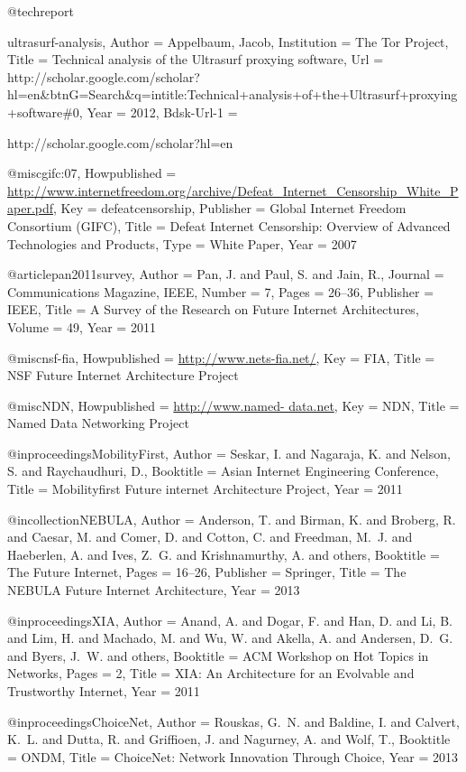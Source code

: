 {{{{{{{@techreport{ultrasurf-analysis,
	Author = {Appelbaum, Jacob},
	Institution = {The Tor Project},
	Title = {{Technical analysis of the Ultrasurf proxying software}},
	Url = {http://scholar.google.com/scholar?hl=en\&btnG=Search\&q=intitle:Technical+analysis+of+the+Ultrasurf+proxying+software\#0},
	Year = {2012},
	Bdsk-Url-1 = {http://scholar.google.com/scholar?hl=en%

@misc{gifc:07,
	Howpublished = {\url{http://www.internetfreedom.org/archive/Defeat\_Internet\_Censorship\_White\_Paper.pdf}},
	Key = {defeatcensorship},
	Publisher = {Global Internet Freedom Consortium (GIFC)},
	Title = {{Defeat Internet Censorship: Overview of Advanced Technologies and Products}},
	Type = {White Paper},
	Year = {2007}}

@article{pan2011survey,
	Author = {Pan, J. and Paul, S. and Jain, R.},
	Journal = {Communications Magazine, IEEE},
	Number = {7},
	Pages = {26--36},
	Publisher = {IEEE},
	Title = {{A Survey of the Research on Future Internet Architectures}},
	Volume = {49},
	Year = {2011}}

@misc{nsf-fia,
	Howpublished = {\url{http://www.nets-fia.net/}},
	Key = {FIA},
	Title = {{NSF Future Internet Architecture Project}}}

@misc{NDN,
	Howpublished = {\url{http://www.named- data.net}},
	Key = {NDN},
	Title = {{Named Data Networking Project}}}

@inproceedings{MobilityFirst,
	Author = {Seskar, I. and Nagaraja, K. and Nelson, S. and Raychaudhuri, D.},
	Booktitle = {Asian Internet Engineering Conference},
	Title = {{Mobilityfirst Future internet Architecture Project}},
	Year = {2011}}

@incollection{NEBULA,
	Author = {Anderson, T. and Birman, K. and Broberg, R. and Caesar, M. and Comer, D. and Cotton, C. and Freedman, M.~J. and Haeberlen, A. and Ives, Z.~G. and Krishnamurthy, A. and others},
	Booktitle = {The Future Internet},
	Pages = {16--26},
	Publisher = {Springer},
	Title = {{The NEBULA Future Internet Architecture}},
	Year = {2013}}

@inproceedings{XIA,
	Author = {Anand, A. and Dogar, F. and Han, D. and Li, B. and Lim, H. and Machado, M. and Wu, W. and Akella, A. and Andersen, D.~G. and Byers, J.~W. and others},
	Booktitle = {ACM Workshop on Hot Topics in Networks},
	Pages = {2},
	Title = {{XIA: An Architecture for an Evolvable and Trustworthy Internet}},
	Year = {2011}}

@inproceedings{ChoiceNet,
	Author = {Rouskas, G.~N. and Baldine, I. and Calvert, K.~L. and Dutta, R. and Griffioen, J. and Nagurney, A. and Wolf, T.},
	Booktitle = {ONDM},
	Title = {{ChoiceNet: Network Innovation Through Choice}},
	Year = {2013}}

}}}}}}}}}

